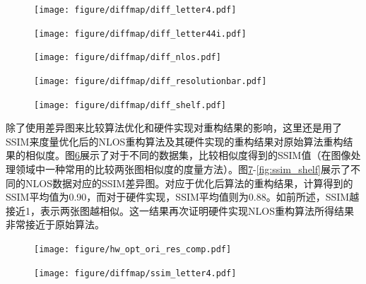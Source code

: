 \documentclass[master]{shtthesis}             %
\begin{document}
\begin{figure}[!b]
  \centering
  \texttt{[image: figure/diffmap/diff\_letter4.pdf]}
  \label{fig:diff_l4}
\end{figure}

\begin{figure}[!tb]
  \centering
  \texttt{[image: figure/diffmap/diff\_letter44i.pdf]}
  \label{fig:diff_l44i}
\end{figure}

\begin{figure}[!tb]
  \centering
  \texttt{[image: figure/diffmap/diff\_nlos.pdf]}
  \label{fig:diff_nlos}
\end{figure}

\begin{figure}[!tb]
  \centering
  \texttt{[image: figure/diffmap/diff\_resolutionbar.pdf]}
  \label{fig:diff_resolutionbar}
\end{figure}

\begin{figure}[!tb]
  \centering
  \texttt{[image: figure/diffmap/diff\_shelf.pdf]}
  \label{fig:diff_shelf}
\end{figure}

除了使用差异图来比较算法优化和硬件实现对重构结果的影响，这里还是用了SSIM来度量优化后的NLOS重构算法及其硬件实现的重构结果对原始算法重构结果的相似度。图\ref{fig:ssim}展示了对于不同的数据集，比较相似度得到的SSIM值（在图像处理领域中一种常用的比较两张图相似度的度量方法）。图\ref{fig:ssim_l4}-\ref{fig:ssim_shelf}展示了不同的NLOS数据对应的SSIM差异图。对应于优化后算法的重构结果，计算得到的SSIM平均值为0.90，而对于硬件实现，SSIM平均值则为0.88。如前所述，SSIM越接近1，表示两张图越相似。这一结果再次证明硬件实现NLOS重构算法所得结果非常接近于原始算法。
\begin{figure}[!tb]
    \centering
    \texttt{[image: figure/hw\_opt\_ori\_res\_comp.pdf]}
    \label{fig:ssim}
\end{figure}

\begin{figure}[!tb]
  \centering
  \texttt{[image: figure/diffmap/ssim\_letter4.pdf]}
  \label{fig:ssim_l4}
\end{figure}
\end{document}
